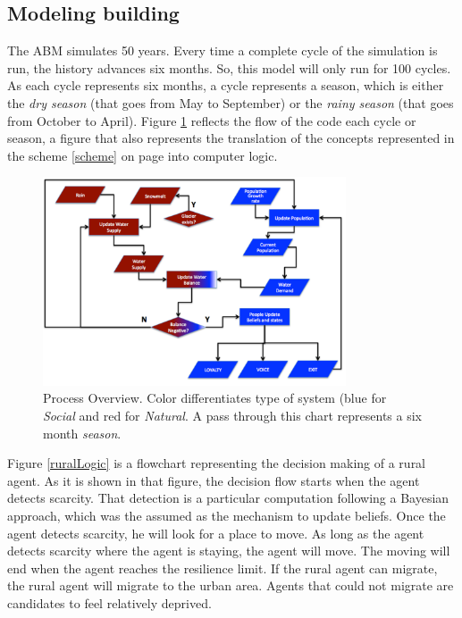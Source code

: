 \documentclass[doc,12pt,floatsintext]{apa7}
\begin{document}

\subsection{Modeling building}

The ABM simulates 50 years. Every time a complete cycle of the simulation is run, the history  advances six months.  So, this model will only run for 100 cycles. As each cycle represents six months, a cycle represents a season, which is either the \emph{dry season} (that goes from May to September) or the \emph{rainy season} (that goes from October to April). Figure \ref{flow1} reflects the flow of the code each cycle or season, a figure that also represents the translation of the concepts represented in the scheme \ref{scheme} on page \pageref{scheme} into computer logic.

\begin{figure}[ht]
\centering
  \includegraphics[width=0.8\textwidth]{flow1}
  \caption[Process Overview]{Process Overview. Color differentiates type of system (blue for  \emph{Social} and red for \emph{Natural}. A pass through this chart represents a six month \emph{season}.}
  \label{flow1}
\end{figure}

Figure \ref{ruralLogic} is a flowchart representing the decision making of a rural agent. As it is shown in that figure, the decision flow starts when the agent detects scarcity. That detection is a particular computation following a Bayesian approach, which was the assumed as the mechanism to update beliefs. Once the agent detects scarcity, he will look for a place to move. As long as the agent detects scarcity where the agent is staying, the agent will move. The moving will end when the agent reaches the resilience limit. If the rural agent can migrate, the rural agent will migrate to the urban area. Agents that could not migrate are candidates to feel relatively deprived.
\end{document}
